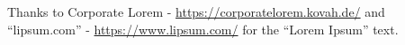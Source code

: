 \def\documentclass[sigconf]{acmart}
\begin{document}
\begin{acks}
Thanks to Corporate Lorem - \url{https://corporatelorem.kovah.de/} and ``lipsum.com'' - \url{https://www.lipsum.com/} for the ``Lorem Ipsum'' text.
\end{acks}







\end{document}

